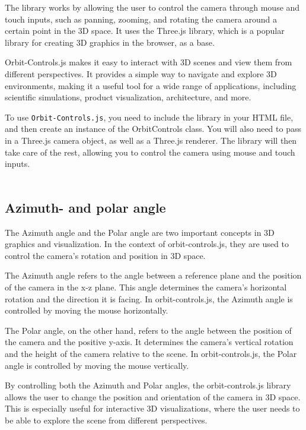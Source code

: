 The library works by allowing the user to control the camera through mouse 
and touch inputs, such as panning, zooming, and rotating the camera around a 
certain point in the 3D space. It uses the Three.js library, which is a popular 
library for creating 3D graphics in the browser, as a base.

Orbit-Controls.js makes it easy to interact with 3D scenes and view them from different 
perspectives. It provides a simple way to navigate and explore 3D environments, making it a 
useful tool for a wide range of applications, including scientific simulations, product visualization, architecture, and more.

To use \texttt{Orbit-Controls.js}, you need to include the library in your HTML file, and then 
create an instance of the OrbitControls class. You will also need to pass in a Three.js 
camera object, as well as a Three.js renderer. The library will then take care of the rest, 
allowing you to control the camera using mouse and touch inputs. \cite{orbitcontrols}
\\
\\
\subsection{Azimuth- and polar angle}
The Azimuth angle and the Polar angle are two important concepts in 3D graphics and visualization. 
In the context of orbit-controls.js, they are used to control the camera's rotation and position in 3D space.

The Azimuth angle refers to the angle between a reference plane and the position of the camera in 
the x-z plane. This angle determines the camera's horizontal rotation and the direction it is facing. 
In orbit-controls.js, the Azimuth angle is controlled by moving the mouse horizontally.

The Polar angle, on the other hand, refers to the angle between the position of the camera and the 
positive y-axis. It determines the camera's vertical rotation and the height of the camera relative 
to the scene. In orbit-controls.js, the Polar angle is controlled by moving the mouse vertically.

By controlling both the Azimuth and Polar angles, the orbit-controls.js library allows the user to 
change the position and orientation of the camera in 3D space. This is especially useful for interactive 
3D visualizations, where the user needs to be able to explore the scene from different perspectives.

